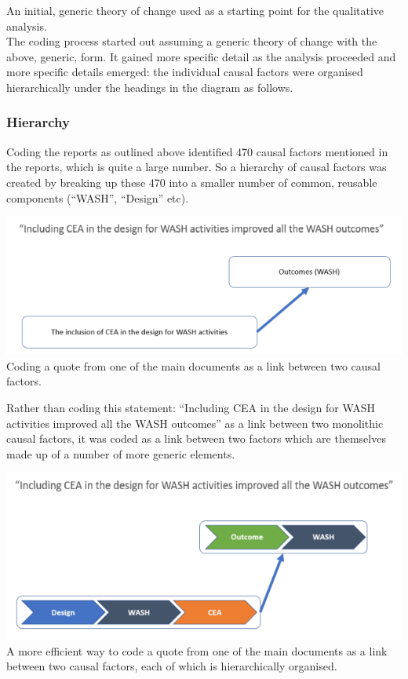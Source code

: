 \documentclass[
]{book}
\begin{document}
An initial, generic theory of change used as a starting point for the qualitative analysis.\\
The coding process started out assuming a generic theory of change with the above,
generic, form. It gained more specific detail as the analysis proceeded and more specific
details emerged: the individual causal factors were organised hierarchically under the
headings in the diagram as follows.

\hypertarget{hierarchy}{%
\subsubsection{Hierarchy}\label{hierarchy}}

Coding the reports as outlined above identified 470 causal factors mentioned in the
reports, which is quite a large number. So a hierarchy of causal factors was created by
breaking up these 470 into a smaller number of common, reusable components
(``WASH'', ``Design'' etc).

\includegraphics{_assets/4a5c0401a54c9651c46474a1f85f8d9e.png}Coding a quote from one of the main documents as a link between two causal factors.

Rather than coding this statement: ``Including CEA in the design for WASH activities
improved all the WASH outcomes'' as a link between two monolithic causal factors, it was
coded as a link between two factors which are themselves made up of a number of more
generic elements.

\includegraphics{_assets/b08c8cb0fc79b3ef6dfe65d3e9a2493a.png}
A more efficient way to code a quote from one of the main documents as a link between
two causal factors, each of which is hierarchically organised.
\end{document}
